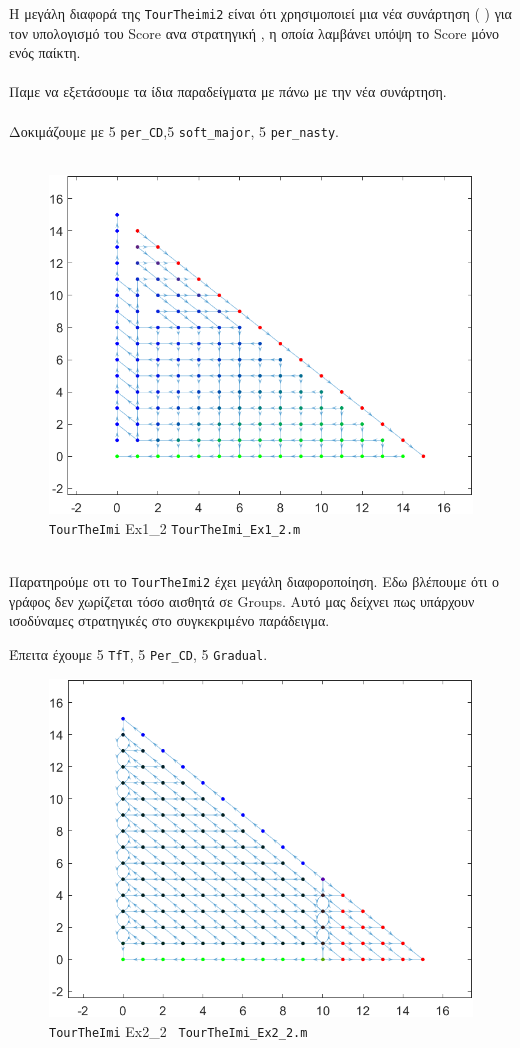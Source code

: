 Η μεγάλη διαφορά της \texttt{TourTheimi2} είναι ότι χρησιμοποιεί μια νέα συνάρτηση ( ) για τον υπολογισμό του Score ανα στρατηγική , η οποία λαμβάνει υπόψη το Score μόνο ενός παίκτη.
\\
\\
Παμε να εξετάσουμε τα ίδια παραδείγματα με πάνω με την νέα συνάρτηση.
\\
\\
Δοκιμάζουμε με 5 \texttt{per\_CD},5 \texttt{soft\_major}, 5 \texttt{per\_nasty}.\\
\\
\begin{figure}[th!]
	\centering
	\includegraphics[width=0.7\linewidth]{TourTheImi_Ex1_2}
	\caption{\texttt{TourTheImi} Ex1\_2 \texttt{TourTheImi\_Ex1\_2.m}}
	\label{fig:tourtheimiex12}
\end{figure}
\\
Παρατηρούμε οτι το \texttt{TourTheImi2} έχει μεγάλη διαφοροποίηση. Εδω βλέπουμε ότι ο γράφος δεν χωρίζεται τόσο αισθητά σε Groups. Αυτό μας δείχνει πως υπάρχουν ισοδύναμες στρατηγικές στο συγκεκριμένο παράδειγμα.
\clearpage

Έπειτα έχουμε 5 \texttt{TfT}, 5 \texttt{Per\_CD}, 5 \texttt{Gradual}.
\begin{figure}[th!]
	\centering
	\includegraphics[width=0.7\linewidth]{TourTheImi_Ex2_2}
	\caption{\texttt{TourTheImi} Ex2\_2    \texttt{ TourTheImi\_Ex2\_2.m}}
	\label{fig:tourtheimiex22}
\end{figure}

